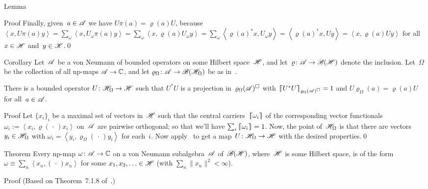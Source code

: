 \documentclass[a]{subfiles}
\begin{document}
\begin{parsec}
\begin{point}{Lemma}
\begin{point}{Proof}
Finally,
given~$a\in\mathscr{A}$
we have $U\pi(a)=\varrho(a)U$,
because $\left<x,U\pi(a)y\right>
= \sum_\omega \left<x,U_\omega \pi(a)y\right>
= \sum_\omega \left<x,\varrho(a) U_\omega y\right>
= \sum_\omega \left<\varrho(a)^* x, U_\omega y\right>
= \left<\varrho(a)^* x, U y\right>
= \left<x, \varrho(a) U y\right>$
for all~$x\in\mathscr{H}$ and~$y\in\mathscr{K}$.\qed
\end{point}
\end{point}
\begin{point}{Corollary}%
Let~$\mathscr{A}$ be a von Neumann 
of bounded operators on some Hilbert space~$\mathscr{H}$,
and let~$\varrho\colon \mathscr{A}\to\mathscr{B}(\mathscr{H})$
denote the inclusion.
Let~$\Omega$ be the collection of all np-maps $\mathscr{A}\to\mathbb{C}$,
and let $\varrho_\Omega\colon \mathscr{A}\to\mathscr{B}(\mathscr{H}_\Omega)$
be as in~.

There is a bounded operator $U\colon \mathscr{H}_\Omega\to\mathscr{H}$
such that $U^*U$ is a projection
in~$\varrho_\Omega(\mathscr{A})^\square$
with 
$\left\lceil\!\!\left\lceil U^*U\right\rceil\!\!\right\rceil_{\varrho_\Omega(\mathscr{A})^\square}=1$
and
$U\varrho_\Omega(a)= \varrho(a) U$
for all~$a\in\mathscr{A}$.
\begin{point}{Proof}%
Let $\{x_i\}_i$ be a maximal set of vectors
in~$\mathscr{H}$ 
such that the 
central carriers~$\left\lceil\!\!\left\lceil\omega_i\right\rceil\!\!\right\rceil$
of the corresponding vector functionals
$\omega_i :=\left<x_i,\varrho(\,\cdot\,)x_i\right>$
on~$\mathscr{A}$
are pairwise orthogonal;
so that we'll 
have $\sum_i \left\lceil\!\!\left\lceil\omega_i\right\rceil\!\!\right\rceil=1$.
Now, the point of~$\mathscr{H}_\Omega$ 
is that there are vectors $y_i\in\mathscr{H}_\Omega$
with $\omega_i=\left<y_i,\varrho_\Omega(\,\cdot\,)y_i\right>$
for each~$i$.
Now apply~
to get a map~$U\colon \mathscr{H}_\Omega\to \mathscr{H}$
with the desired properties.\qed
\end{point}
\end{point}
\begin{point}{Theorem}%
Every np-map $\omega\colon \mathscr{A}\to\mathbb{C}$
on a von Neumann subalgebra~$\mathscr{A}$
of~$\mathscr{B}(\mathscr{H})$,
where~$\mathscr{H}$ is some Hilbert space,
is of the 
form~$\omega \equiv \sum_n \left<x_n,(\,\cdot\,)x_n\right>$
for some $x_1,x_2,\dotsc \in\mathscr{H}$
(with $\sum_n\|x_n\|^2<\infty$).
\begin{point}{Proof}%
(Based on Theorem~7.1.8 of~\cite{kr}.)


\end{point}
\end{point}
\end{parsec}
\end{document}
